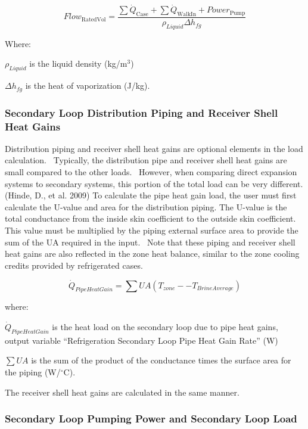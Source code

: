 \begin{equation}
Flo{w_{{\mathrm{RatedVol}}}} = \frac{{\sum {{{\dot Q}_{{\mathrm{Case}}}} + \sum {{{\dot Q}_{{\mathrm{WalkIn}}}} + Powe{r_{{\mathrm{Pump}}}}} } }}{{{\rho_{Liquid}}\Delta {h_{fg}}}}
\end{equation}

Where:

\(\rho_{Liquid}\) is the liquid density (kg/m\(^{3}\))

\(\Delta h_{fg}\) is the heat of vaporization (J/kg).

\subsubsection{Secondary Loop Distribution Piping and Receiver Shell Heat Gains}\label{secondary-loop-distribution-piping-and-receiver-shell-heat-gains}

Distribution piping and receiver shell heat gains are optional elements in the load calculation.~ Typically, the distribution pipe and receiver shell heat gains are small compared to the other loads.~ However, when comparing direct expansion systems to secondary systems, this portion of the total load can be very different. (Hinde, D., et al. 2009) To calculate the pipe heat gain load, the user must first calculate the U-value and area for the distribution piping. The U-value is the total conductance from the inside skin coefficient to the outside skin coefficient. This value must be multiplied by the piping external surface area to provide the sum of the UA required in the input.~ Note that these piping and receiver shell heat gains are also reflected in the zone heat balance, similar to the zone cooling credits provided by refrigerated cases.

\begin{equation}
{\dot Q_{PipeHeatGain}} = \sum U A (T_{zone} -- T_{BrineAverage})
\end{equation}

where:

\({\dot Q_{PipeHeatGain}}\) is the heat load on the secondary loop due to pipe heat gains, output variable ``Refrigeration Secondary Loop Pipe Heat Gain Rate'' (W)

\(\sum U A\) is the sum of the product of the conductance times the surface area for the piping (W/\(^{\circ}\)C).

The receiver shell heat gains are calculated in the same manner.

\subsubsection{Secondary Loop Pumping Power and Secondary Loop Load}\label{secondary-loop-pumping-power-and-secondary-loop-load}

